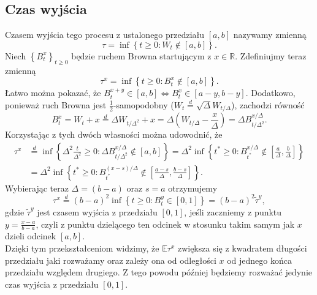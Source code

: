 \documentclass[12pt]{mwrep}
\begin{document}
	\subsection{Czas wyjścia}
	\noindent Czasem wyjścia tego procesu z ustalonego przedziału $[a, b]$ nazywamy zmienną
	\begin{equation*}
		\tau=\inf\left\{t\geqslant0:W_t\notin[a, b]\right\}.
	\end{equation*}
	Niech $\left\{B^x_t\right\}_{t\geqslant0}$ będzie ruchem Browna startującym z $x\in\mathbb{R}$. Zdefiniujmy teraz zmienną 
	\begin{equation*}
		\tau^x=\inf\left\{t\geqslant0:B^x_t\notin[a, b]\right\}.
	\end{equation*}
	 Łatwo można pokazać, że $B^{x+y}_t\in[a ,b] \iff B^x_t\in[a-y, b-y]$.
	Dodatkowo, ponieważ ruch Browna jest $\frac{1}{2}$-samopodobny ($W_t\overset{d}{=}\sqrt{\Delta}W_{t/\Delta}$), zachodzi równość
	\begin{equation*}
		B^x_t=W_t+x\overset{d}{=}\Delta W_{t/\Delta^2}+x = \Delta\left(W_{t/\Delta}-\frac{x}{\Delta}\right)=\Delta B^{x/\Delta}_{t/\Delta^2}.
	\end{equation*}
	Korzystając z tych dwóch własności można udowodnić, że
	\begin{equation*}
		\begin{split}
			\tau^x&\overset{d}{=}\inf\left\{\Delta^2\frac{t}{\Delta^2}\geqslant0:\Delta B^{x/\Delta}_{t/\Delta^2}\notin[a, b]\right\} =\Delta^2\inf\left\{t^*\geqslant0:B^{x/\Delta}_{t^*}\notin\left[\frac{a}{\Delta},\frac{b}{\Delta}\right]\right\}\\
			&=\Delta^2\inf\left\{t^*\geqslant0:B^{(x-s)/\Delta}_{t^*}\notin\left[\frac{a-s}{\Delta},\frac{b-s}{\Delta}\right]\right\}.
		\end{split}
	\end{equation*}
	Wybierając teraz $\Delta=(b-a)$ oraz $s=a$ otrzymujemy
	\begin{equation}\label{eq:tau_przeskalowane}
		\tau^x\overset{d}{=}(b-a)^2\inf\left\{t\geqslant0:B^y_t\in[0,1]\right\}=(b-a)^2\widetilde\tau^y,
	\end{equation}
	gdzie $\widetilde\tau^y$ jest czasem wyjścia z przedziału $[0, 1]$, jeśli zaczniemy z punktu $y=\frac{x-a}{b-a}$, czyli z punktu dzielącego ten odcinek w stosunku takim samym jak $x$ dzieli odcinek $[a, b]$.\vspace{1.5mm}\\
	\noindent Dzięki tym przekształceniom widzimy, że $\mathbb{E}\tau^x$ zwiększa się z kwadratem długości przedziału jaki rozważamy oraz zależy ona od odległości $x$ od jednego końca przedziału względem drugiego. Z tego powodu później będziemy rozważać jedynie czas wyjścia z przedziału $[0, 1]$.
	
\end{document}
